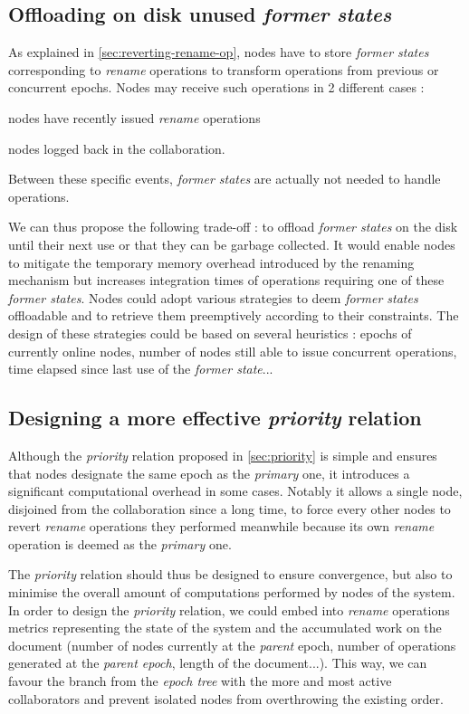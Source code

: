 \documentclass[sigplan,10pt]{acmart}
\begin{document}
\subsection{Offloading on disk unused \emph{former states}}
\label{sec:offloading-former-states}

As explained in \autoref{sec:reverting-rename-op}, nodes have to store \emph{former states} corresponding to \emph{rename} operations to transform operations from previous or concurrent epochs.
Nodes may receive such operations in 2 different cases :
\begin{enumerate*}[label=(\roman*)]
    \item nodes have recently issued \emph{rename} operations
    \item nodes logged back in the collaboration.
\end{enumerate*}
Between these specific events, \emph{former states} are actually not needed to handle operations.

We can thus propose the following trade-off : to offload \emph{former states} on the disk until their next use or that they can be garbage collected.
It would enable nodes to mitigate the temporary memory overhead introduced by the renaming mechanism but increases integration times of operations requiring one of these \emph{former states}.
Nodes could adopt various strategies to deem \emph{former states} offloadable and to retrieve them preemptively according to their constraints.
The design of these strategies could be based on several heuristics : epochs of currently online nodes, number of nodes still able to issue concurrent operations, time elapsed since last use of the \emph{former state}...

\subsection{Designing a more effective \emph{priority} relation}
\label{sec:designing-more-effective-priority-relation}

Although the \emph{priority} relation proposed in \autoref{sec:priority} is simple and ensures that nodes designate the same epoch as the \emph{primary} one, it introduces a significant computational overhead in some cases.
Notably it allows a single node, disjoined from the collaboration since a long time, to force every other nodes to revert \emph{rename} operations they performed meanwhile because its own \emph{rename} operation is deemed as the \emph{primary} one.

The \emph{priority} relation should thus be designed to ensure convergence, but also to minimise the overall amount of computations performed by nodes of the system.
In order to design the \emph{priority} relation, we could embed into \emph{rename} operations metrics representing the state of the system and the accumulated work on the document (number of nodes currently at the \emph{parent} epoch, number of operations generated at the \emph{parent epoch}, length of the document...).
This way, we can favour the branch from the \emph{epoch tree} with the more and most active collaborators and prevent isolated nodes from overthrowing the existing order.
\end{document}
